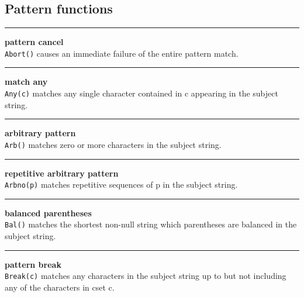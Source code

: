 \subsection*{Pattern functions}

\bigskip\hrule\vspace{0.1cm}
 \hfill{\bf pattern cancel}\\

\noindent
\texttt{Abort()} causes an immediate failure of the entire pattern match.\\


\bigskip\hrule\vspace{0.1cm}
 \hfill{\bf match any}\\

\noindent
\texttt{Any(c)} matches any single character contained in c appearing
in the subject string.\\

\bigskip\hrule\vspace{0.1cm}
 \hfill{\bf arbitrary pattern}\\

\noindent
\texttt{Arb()} matches zero or more characters in the subject string.\\


\bigskip\hrule\vspace{0.1cm}
 \hfill{\bf repetitive arbitrary pattern}\\

\noindent
\texttt{Arbno(p)} matches repetitive sequences of p in the subject string.\\


\bigskip\hrule\vspace{0.1cm}
 \hfill{\bf balanced parentheses}\\

\noindent
\texttt{Bal()} matches the shortest non-null string which parentheses
are balanced in the subject string.\\


\bigskip\hrule\vspace{0.1cm}
 \hfill{\bf pattern break}\\

\noindent
\texttt{Break(c)} matches any characters in the subject string up to
but not including any of the characters in cset c.\\


